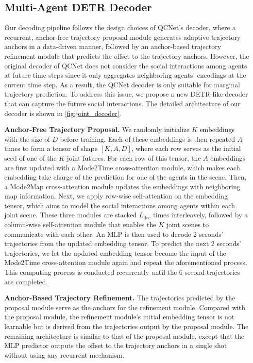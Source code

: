 \documentclass[10pt,twocolumn,letterpaper]{article}
\begin{document}
\subsection{Multi-Agent DETR Decoder}

Our decoding pipeline follows the design choices of QCNet's decoder, where a recurrent, anchor-free trajectory proposal module generates adaptive trajectory anchors in a data-driven manner, followed by an anchor-based trajectory refinement module that predicts the offset to the trajectory anchors. However, the original decoder of QCNet does not consider the social interactions among agents at future time steps since it only aggregates neighboring agents' encodings at the current time step. As a result, the QCNet decoder is only suitable for marginal trajectory prediction. To address this issue, we propose a new DETR-like decoder that can capture the future social interactions. The detailed architecture of our decoder is shown in \cref{fig:joint_decoder}.

\noindent \textbf{Anchor-Free Trajectory Proposal.} We randomly initialize $K$ embeddings with the size of $D$ before training. Each of these embeddings is then repeated $A$ times to form a tensor of shape $[K, A, D]$, where each row serves as the initial seed of one of the $K$ joint futures. For each row of this tensor, the $A$ embeddings are first updated with a Mode2Time cross-attention module, which makes each embedding take charge of the prediction for one of the agents in the scene. Then, a Mode2Map cross-attention module updates the embeddings with neighboring map information. Next, we apply row-wise self-attention on the embedding tensor, which aims to model the social interactions among agents within each joint scene. These three modules are stacked $L_{\text{dec}}$ times interleavely, followed by a column-wise self-attention module that enables the $K$ joint scenes to communicate with each other. An MLP is then used to decode $2$ seconds' trajectories from the updated embedding tensor. To predict the next $2$ seconds' trajectories, we let the updated embedding tensor become the input of the Mode2Time cross-attention module again and repeat the aforementioned process. This computing process is conducted recurrently until the $6$-second trajectories are completed.

\noindent \textbf{Anchor-Based Trajectory Refinement.} The trajectories predicted by the proposal module serve as the anchors for the refinement module. Compared with the proposal module, the refinement module's initial embedding tensor is not learnable but is derived from the trajectories output by the proposal module. The remaining architecture is similar to that of the proposal module, except that the MLP predictor outputs the offset to the trajectory anchors in a single shot without using any recurrent mechanism.
\end{document}
